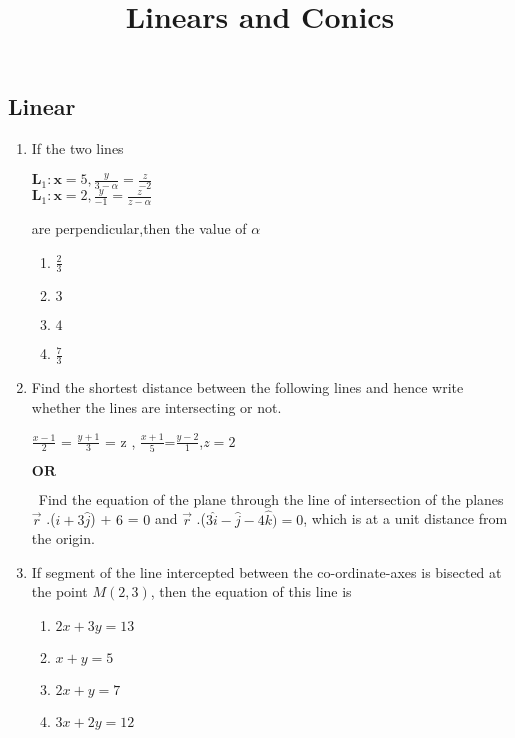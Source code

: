 \documentclass{article}
\let\vec\mathbf{}
\begin{document}
\begin{center}
\title{ Linears and Conics}
\date{}
\maketitle
\section{Linear}     
\end{center}
\begin{enumerate}
    \item If the two lines
    \begin{center}
        $\vec{L}_1 : \vec{x}=5,\frac{y}{3-\alpha}=\frac{z}{-2}$\\
        $\vec{L}_1 : \vec{x}=2,\frac{y}{-1}=\frac{z}{z-\alpha}$\\
        
    \end{center}
    are perpendicular,then the value of $\alpha$ \\
    \begin{enumerate}
        \item $\frac{2}{3}$
        \item $3$
        \item $4$
        \item $\frac{7}{3}$
    \end{enumerate}
    \item Find the shortest distance between the following lines and hence write
whether the lines are intersecting or not.\\
\begin{center}
    $\frac{x-1}{2}$ = $\frac{y+1}{3}$ = z , $\frac{x+1}{5}$=$\frac{y-2}{1}$,$z=2$
\end{center}
\begin{center}
    $\textbf{OR}$
\end{center}
\ Find the equation of the plane through the line of intersection of the planes \\
    $ \overrightarrow{r}$ .($\hat{i}+3\hat{j}$) + $6$ = $0$  and  $ \overrightarrow{r}$ .($3\hat{i} - \hat{j} - 4\hat{k}) = 0$, which is at a unit distance from the origin.\\
    \item If segment of the line intercepted between the co-ordinate-axes is bisected
at the point $M(2, 3)$, then the equation of this line is
 \begin{enumerate}
     \item $2x + 3y = 13$
     \item $ x + y = 5 $
     \item $ 2x + y = 7$
     \item $3x + 2y = 12 $
 \end{enumerate} 
 

\end{enumerate}
\end{document}

